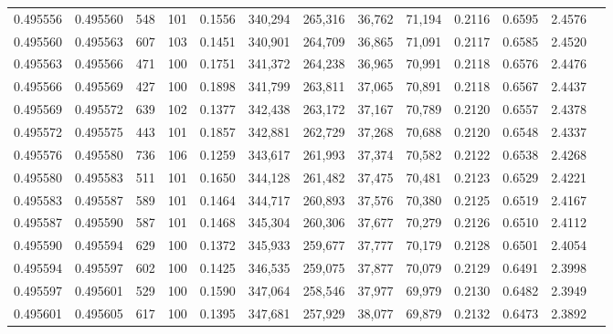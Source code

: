 \begin{tabular}{rrrrrrrrrrrrr}
0.495556 & 0.495560 &   548 & 101 &                                     0.1556 & 340,294 & 265,316 &  36,762 &  71,194 & 0.2116 & 0.6595 & 2.4576 \\
0.495560 & 0.495563 &   607 & 103 &                                     0.1451 & 340,901 & 264,709 &  36,865 &  71,091 & 0.2117 & 0.6585 & 2.4520 \\
0.495563 & 0.495566 &   471 & 100 &                                     0.1751 & 341,372 & 264,238 &  36,965 &  70,991 & 0.2118 & 0.6576 & 2.4476 \\
0.495566 & 0.495569 &   427 & 100 &                                     0.1898 & 341,799 & 263,811 &  37,065 &  70,891 & 0.2118 & 0.6567 & 2.4437 \\
0.495569 & 0.495572 &   639 & 102 &                                     0.1377 & 342,438 & 263,172 &  37,167 &  70,789 & 0.2120 & 0.6557 & 2.4378 \\
0.495572 & 0.495575 &   443 & 101 &                                     0.1857 & 342,881 & 262,729 &  37,268 &  70,688 & 0.2120 & 0.6548 & 2.4337 \\
0.495576 & 0.495580 &   736 & 106 &                                     0.1259 & 343,617 & 261,993 &  37,374 &  70,582 & 0.2122 & 0.6538 & 2.4268 \\
0.495580 & 0.495583 &   511 & 101 &                                     0.1650 & 344,128 & 261,482 &  37,475 &  70,481 & 0.2123 & 0.6529 & 2.4221 \\
0.495583 & 0.495587 &   589 & 101 &                                     0.1464 & 344,717 & 260,893 &  37,576 &  70,380 & 0.2125 & 0.6519 & 2.4167 \\
0.495587 & 0.495590 &   587 & 101 &                                     0.1468 & 345,304 & 260,306 &  37,677 &  70,279 & 0.2126 & 0.6510 & 2.4112 \\
0.495590 & 0.495594 &   629 & 100 &                                     0.1372 & 345,933 & 259,677 &  37,777 &  70,179 & 0.2128 & 0.6501 & 2.4054 \\
0.495594 & 0.495597 &   602 & 100 &                                     0.1425 & 346,535 & 259,075 &  37,877 &  70,079 & 0.2129 & 0.6491 & 2.3998 \\
0.495597 & 0.495601 &   529 & 100 &                                     0.1590 & 347,064 & 258,546 &  37,977 &  69,979 & 0.2130 & 0.6482 & 2.3949 \\
0.495601 & 0.495605 &   617 & 100 &                                     0.1395 & 347,681 & 257,929 &  38,077 &  69,879 & 0.2132 & 0.6473 & 2.3892 \\

\end{tabular}
